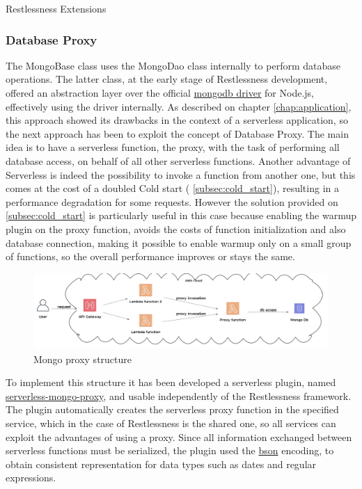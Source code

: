 \begin{chapter}{Restlessness Extensions}
    \subsubsection{Database Proxy}
    \label{subsec:database_proxy}
    The MongoBase class uses the MongoDao class internally to perform database
    operations. The latter class, at the early stage of Restlessness development,
    offered an abstraction layer over the official
    \href{https://www.npmjs.com/package/mongodb}{mongodb driver} for Node.js,
    effectively using the driver internally.
    As described on chapter \ref{chap:application}, this approach showed its
    drawbacks in the context of a serverless application, so the next approach has
    been to exploit the concept of Database Proxy.
    The main idea is to have a serverless function, the proxy, with the task of
    performing all database access, on behalf of all other serverless functions.
    Another advantage of Serverless is indeed the possibility to invoke a function
    from another one, but this comes at the cost of a doubled Cold start (
    \ref{subsec:cold_start}), resulting in a performance degradation for some requests.
    However the solution provided on \ref{subsec:cold_start} is particularly useful in
    this case because enabling the warmup plugin on the proxy function, avoids the
    costs of function initialization and also database connection, making it possible
    to enable warmup only on a small group of functions, so the overall performance
    improves or stays the same.

    \begin{figure}
        \centering
        \includegraphics[width=\linewidth]{source/diagrams/mongo_proxy.png}
        \caption{Mongo proxy structure}
    \end{figure}

    To implement this structure it has been developed a serverless plugin, named
    \href{https://www.npmjs.com/package/serverless-mongo-proxy}{serverless-mongo-proxy},
    and usable independently of the Restlessness framework.
    The plugin automatically creates the serverless proxy function in the specified
    service, which in the case of Restlessness is the shared one, so all services
    can exploit the advantages of using a proxy.
    Since all information exchanged between serverless functions must be serialized,
    the plugin used the \href{http://bsonspec.org/}{bson} encoding, to obtain consistent
    representation for data types such as dates and regular expressions.


\end{chapter}

